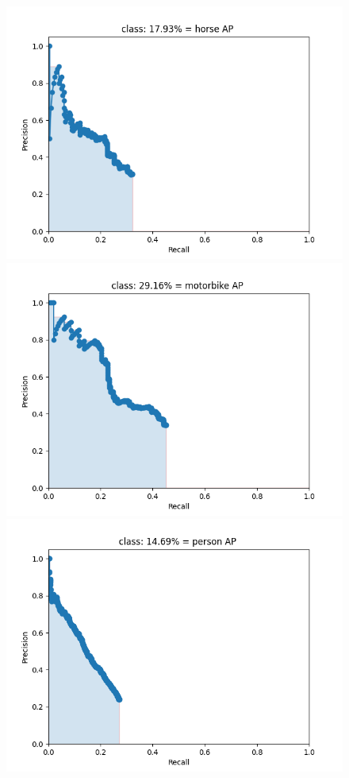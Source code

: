 \documentclass{article}%
\begin{document}
\begin{figure}[H]
    \centering
	\begin{minipage}{0.24\linewidth}
		\centering
		\includegraphics[width=0.9\linewidth]{fast_rcnn/mAP_output/classes/horse.png}
	\end{minipage}
	\begin{minipage}{0.24\linewidth}
		\centering
		\includegraphics[width=0.9\linewidth]{fast_rcnn/mAP_output/classes/motorbike.png}
	\end{minipage}
    \begin{minipage}{0.24\linewidth}
		\centering
		\includegraphics[width=0.9\linewidth]{fast_rcnn/mAP_output/classes/person.png}

\end{minipage}
\end{figure}
\end{document}
